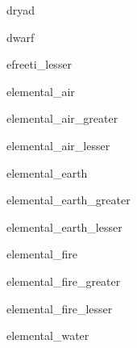 \documentclass[letterpaper,serif]{module}
\begin{document}
\begin{newmonster}{dryad}\end{newmonster}

\begin{newmonster}{dwarf}\end{newmonster}

\begin{newmonster}{efreeti_lesser}\end{newmonster}

\begin{newmonster}{elemental_air}\end{newmonster}

\begin{newmonster}{elemental_air_greater}\end{newmonster}

\begin{newmonster}{elemental_air_lesser}\end{newmonster}

\begin{newmonster}{elemental_earth}\end{newmonster}

\begin{newmonster}{elemental_earth_greater}\end{newmonster}

\begin{newmonster}{elemental_earth_lesser}\end{newmonster}

\begin{newmonster}{elemental_fire}\end{newmonster}

\begin{newmonster}{elemental_fire_greater}\end{newmonster}

\begin{newmonster}{elemental_fire_lesser}\end{newmonster}

\begin{newmonster}{elemental_water}\end{newmonster}
\end{document}

